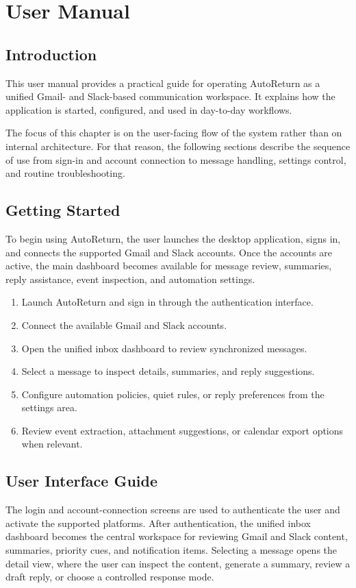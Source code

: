 \chapter{User Manual}
\label{sec:user_manual}

\section{Introduction}
This user manual provides a practical guide for operating AutoReturn as a unified Gmail- and Slack-based communication workspace. It explains how the application is started, configured, and used in day-to-day workflows.

The focus of this chapter is on the user-facing flow of the system rather than on internal architecture. For that reason, the following sections describe the sequence of use from sign-in and account connection to message handling, settings control, and routine troubleshooting.

\section{Getting Started}
To begin using AutoReturn, the user launches the desktop application, signs in, and connects the supported Gmail and Slack accounts. Once the accounts are active, the main dashboard becomes available for message review, summaries, reply assistance, event inspection, and automation settings.

\begin{enumerate}
    \item Launch AutoReturn and sign in through the authentication interface.
    \item Connect the available Gmail and Slack accounts.
    \item Open the unified inbox dashboard to review synchronized messages.
    \item Select a message to inspect details, summaries, and reply suggestions.
    \item Configure automation policies, quiet rules, or reply preferences from the settings area.
    \item Review event extraction, attachment suggestions, or calendar export options when relevant.
\end{enumerate}

\section{User Interface Guide}
The login and account-connection screens are used to authenticate the user and activate the supported platforms. After authentication, the unified inbox dashboard becomes the central workspace for reviewing Gmail and Slack content, summaries, priority cues, and notification items. Selecting a message opens the detail view, where the user can inspect the content, generate a summary, review a draft reply, or choose a controlled response mode.

